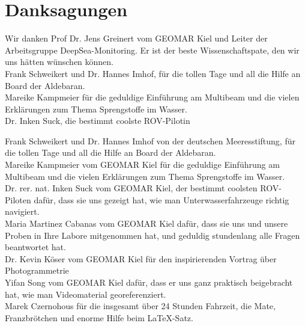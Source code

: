 

\chapter[Danksagungen]{Danksagungen}
Wir danken Prof Dr. Jens Greinert vom GEOMAR Kiel und Leiter der Arbeitsgruppe DeepSea-Monitoring. Er ist der beste Wissenschaftspate, den wir uns hätten wünschen können.\\
Frank Schweikert und Dr. Hannes Imhof, für die tollen Tage und all die Hilfe an Board der Aldebaran. \\

Mareike Kampmeier für die geduldige Einführung am Multibeam und die vielen Erklärungen zum Thema Sprengstoffe im Wasser. \\

Dr. Inken Suck, die bestimmt coolste ROV-Pilotin



Frank Schweikert und Dr. Hannes Imhof von der deutschen Meeresstiftung, für die tollen Tage und all die Hilfe an Board der Aldebaran. \\


Mareike Kampmeier vom GEOMAR Kiel für die geduldige Einführung am Multibeam und die vielen Erklärungen zum Thema Sprengstoffe im Wasser. \\


Dr. rer. nat. Inken Suck vom GEOMAR Kiel, der bestimmt coolsten ROV-Piloten dafür, dass sie uns gezeigt hat, wie man Unterwasserfahrzeuge richtig navigiert. \\


Maria Martinez Cabanas vom GEOMAR Kiel dafür, dass sie uns und unsere Proben in Ihre Labore mitgenommen hat, und geduldig stundenlang alle Fragen beantwortet hat.\\


Dr. Kevin Köser vom GEOMAR Kiel für den inspirierenden Vortrag über Photogrammetrie \\


Yifan Song vom GEOMAR Kiel dafür, dass er uns ganz praktisch beigebracht hat, wie man Videomaterial georeferenziert.\\


Marek Czernohous für die insgesamt über 24 Stunden Fahrzeit, die Mate, Franzbrötchen und enorme Hilfe beim \LaTeX -Satz.\\


